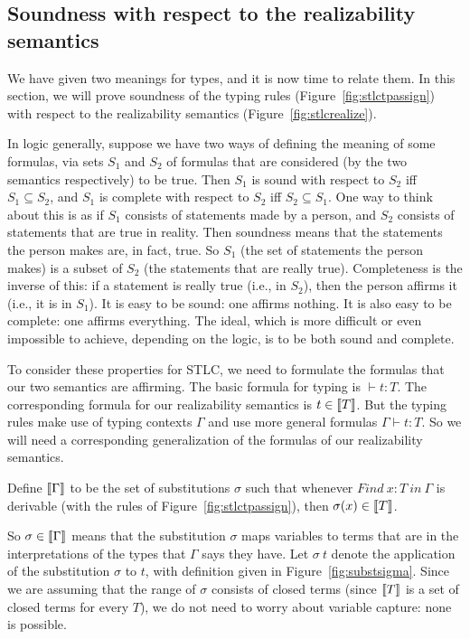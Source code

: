 \subsection{Soundness with respect to the realizability semantics}

We have given two meanings for types, and it is now time to relate
them.  In this section, we will prove soundness of the typing rules
(Figure~\ref{fig:stlctpassign}) with respect to the realizability
semantics (Figure~\ref{fig:stlcrealize}).

In logic generally, suppose we have two ways of defining the meaning
of some formulas, via sets $S_1$ and $S_2$ of formulas that are
considered (by the two semantics respectively) to be true.  Then $S_1$
is sound with respect to $S_2$ iff $S_1 \subseteq S_2$, and $S_1$ is
complete with respect to $S_2$ iff $S_2 \subseteq
S_1$. One way to think about this is as
if $S_1$ consists of statements made by a person, and $S_2$ consists
of statements that are true in reality.  Then soundness means that the
statements the person makes are, in fact, true.  So $S_1$ (the set of
statements the person makes) is a subset of $S_2$ (the statements that
are really true).  Completeness is the inverse of this: if a statement
is really true (i.e., in $S_2$), then the person affirms it (i.e., it
is in $S_1$).  It is easy to be sound: one affirms nothing.  It is
also easy to be complete: one affirms everything.  The ideal, which is
more difficult or even impossible to achieve, depending on the logic,
is to be both sound and complete.

To consider these properties for STLC, we need to formulate the
formulas that our two semantics are affirming.  The basic formula for
typing is $\vdash t : T$.  The corresponding formula for our
realizability semantics is $t \in \llbracket T \rrbracket$.  But the typing rules
make use of typing contexts $\Gamma$ and use more general formulas
$\Gamma \vdash t : T$.  So we will need a corresponding generalization
of the formulas of our realizability semantics.

\begin{definition}
  \label{def:substmodels}
  Define $\llbracket \Gamma \rrbracket$ to be the set of substitutions $\sigma$ such that
  whenever $\textit{Find}\ x:T\ \textit{in}\ \Gamma$ is derivable (with the rules of Figure~\ref{fig:stlctpassign}),
  then $\sigma(x) \in \llbracket T \rrbracket$.
\end{definition}

So $\sigma\in\llbracket \Gamma \rrbracket$ means that the substitution $\sigma$
maps variables to terms that are in the interpretations of the types
that $\Gamma$ says they have.  Let $\sigma\ t$ denote the 
application of the substitution $\sigma$ to $t$, with definition
given in Figure~\ref{fig:substsigma}.  Since we are assuming that the
range of $\sigma$ consists of closed terms (since $\llbracket T \rrbracket$ is a set
of closed terms for every $T$), we do not need to worry
about variable capture: none is possible.

